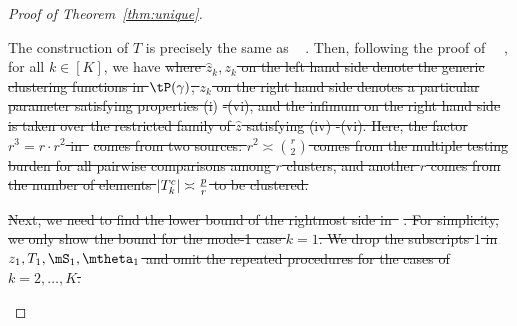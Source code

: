 \documentclass[lettersize,onecolumn,journal]{IEEEtran}
\theoremstyle{definition}
\theoremstyle{definition}
\providecommand{\DIFaddtex}[1]{{\protect\color{blue}\uwave{#1}}} %
\providecommand{\DIFdeltex}[1]{{\protect\color{red}\sout{#1}}}                      %
\providecommand{\DIFaddbegin}{} %
\providecommand{\DIFaddend}{} %
\providecommand{\DIFdelbegin}{} %
\providecommand{\DIFdelend}{} %
\providecommand{\DIFadd}[1]{\texorpdfstring{\DIFaddtex{#1}}{#1}} %
\providecommand{\DIFdel}[1]{\texorpdfstring{\DIFdeltex{#1}}{}} %
\newcommand{\DIFscaledelfig}{0.5}
\newlength{\DIFdelgraphicswidth} %
\newlength{\DIFdelgraphicsheight} %
\newcommand{\DIFaddincludegraphics}[2][]{{\color{blue}\fbox{\DIFOincludegraphics[#1]{#2}}}} %
\newcommand{\DIFdelincludegraphics}[2][]{%
\sbox{\DIFdelgraphicsbox}{\DIFOincludegraphics[#1]{#2}}%
\settoboxwidth{\DIFdelgraphicswidth}{\DIFdelgraphicsbox} %
\settoboxtotalheight{\DIFdelgraphicsheight}{\DIFdelgraphicsbox} %
\scalebox{\DIFscaledelfig}{%
\parbox[b]{\DIFdelgraphicswidth}{\usebox{\DIFdelgraphicsbox}\\[-\baselineskip] \rule{\DIFdelgraphicswidth}{0em}}\llap{\resizebox{\DIFdelgraphicswidth}{\DIFdelgraphicsheight}{%
\setlength{\unitlength}{\DIFdelgraphicswidth}%
\begin{picture}(1,1)%
\thicklines\linethickness{2pt} %
{\color[rgb]{1,0,0}\put(0,0){\framebox(1,1){}}}%
{\color[rgb]{1,0,0}\put(0,0){\line( 1,1){1}}}%
{\color[rgb]{1,0,0}\put(0,1){\line(1,-1){1}}}%
\end{picture}%
}\hspace*{3pt}}} %
} %
\DeclareRobustCommand{\DIFaddbegin}{\DIFOaddbegin \let\includegraphics\DIFaddincludegraphics} %
\DeclareRobustCommand{\DIFaddend}{\DIFOaddend \let\includegraphics\DIFOincludegraphics} %
\DeclareRobustCommand{\DIFdelbegin}{\DIFOdelbegin \let\includegraphics\DIFdelincludegraphics} %
\DeclareRobustCommand{\DIFdelend}{\DIFOaddend \let\includegraphics\DIFOincludegraphics} %
\begin{document}
\begin{proof}[Proof of Theorem~\ref{thm:unique}]
\begin{enumerate}[wide]
{%
The construction of $T$ is precisely the same as \mbox{%
\citet[Proof of Theorem 6]{han2020exact}}\hspace{0pt}%
. 
Then, following the proof of~\mbox{%
\citet[Theorem 2]{gao2018community}}\hspace{0pt}%
, for all $k \in [K]$, we have
}%
\DIFdel{where $\hat z_k, z_k$ on the left hand side denote the generic clustering functions in $\tP(\gamma)$, $z_k$ on the right hand side denotes a particular parameter satisfying properties (i}\DIFdelend \DIFaddbegin \DIFadd{j)$. If $z_1(i}\DIFaddend ) \DIFdelbegin \DIFdel{-(vi), and the infimum on the right hand side is taken over the restricted family of $\hat z$ satisfying (iv) -(vi). Here, the factor $r^3=r\cdot r^2$ in~}%
\DIFdel{comes from two sources: $r^2\asymp {r\choose 2}$ comes from the multiple testing burden for all pairwise comparisons among $r$ clusters, and another $r$ comes from the number of elements $|T^c_k|\asymp {p\over r}$ to be clustered. 
}%

\DIFdel{Next, we need to find the lower bound of the rightmost side in~}%
\DIFdel{. For simplicity, we only show the bound for the mode-1 case $k = 1$. We drop the subscripts $1$ in $z_1, T_1, \mS_1, \mtheta_1$ and omit the repeated procedures for the cases of $k = 2,\ldots, K$. 
}%


\end{enumerate}
\end{proof}
\end{document}
